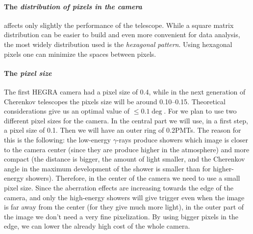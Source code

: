 \paragraph{The \emph{distribution of pixels in the camera}} affects only
slightly   the performance of  the  telescope.  While  a square matrix
distribution can be easier to build  and even more convenient for data
analysis, the most   widely distribution used  is  the \emph{hexagonal
  pattern}. Using hexagonal pixels one can minimize the spaces between
pixels.

\paragraph{The \emph{pixel size}} The first HEGRA camera had a pixel 
size of 0.4\deg, while in  the next generation of Cherenkov telescopes
the pixels  size   will  be around   0.10\deg--0.15\deg.   Theoretical
considerations give us an optimal value of  $\leq 0.1\deg$. For \MAGIC
we   plan to use  two different  pixel sizes   for  the camera. In the
central part we  will use, in  a first step, a  pixel size of 0.1\deg. 
Then we will have  an outer ring of  0.2\deg PMTs. The reason for this
is the following: the  low-energy $\gamma$-rays produce showers  which
image is closer to the camera center (since they are produce higher in
the atmosphere)  and more compact (the  distance is bigger, the amount
of light  smaller, and the Cherenkov  angle in the maximum development
of  the shower is smaller than  for higher-energy showers). Therefore,
in the center of the camera  we need to  use a small pixel size. Since
the aberration effects are increasing towards  the edge of the camera,
and only the high-energy showers will give trigger even when the image
is  far away from the center  (for they give  much more light), in the
outer  part of the  image we don't need  a very  fine pixelization. By
using bigger pixels in the edge, we can lower the already high cost of
the whole camera.

\mirrorsandwichfig

